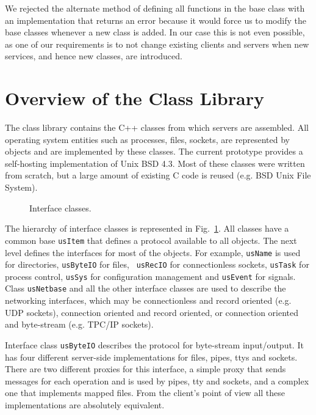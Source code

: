 We rejected the alternate method of defining all functions in the base
class with an implementation that returns an error because it would
force us to modify the base classes whenever a new class is added. In
our case this is not even possible, as one of our requirements is to
not change existing clients and servers when new services, and hence
new classes, are introduced.

\section{Overview of the Class Library}

The class library contains the C++ classes from which servers
are assembled. All operating system entities such as processes, files,
sockets, are represented by objects and are implemented by these
classes. The current prototype provides a self-hosting implementation
of Unix BSD 4.3.  Most of these classes were written from scratch,
but a large amount of existing C code is reused (e.g. BSD Unix File
System). 

\begin{figure}[htbp]
\vspace{7cm}
{}
\caption{Interface classes.}
\label{fig_intclasses}
\end{figure}

The hierarchy of interface classes is represented in
Fig.~\ref{fig_intclasses}. All classes have a common base {\tt usItem}
that defines a protocol available to all objects. The next
level defines the interfaces for most of the objects. For example,
{\tt usName} is used for directories, {\tt usByteIO} for files, {\tt
usRecIO} for connectionless sockets, {\tt usTask} for process control,
{\tt usSys} for configuration management and {\tt usEvent} for signals.
Class {\tt usNetbase} and all the other interface classes are used to
describe the networking interfaces, which may be connectionless and
record oriented (e.g. UDP sockets), connection oriented and record
oriented, or connection oriented and byte-stream (e.g. TPC/IP
sockets).

Interface class {\tt usByteIO} describes the protocol for
byte-stream input/output. It has four different server-side
implementations for files, pipes, ttys and sockets. There are two
different proxies for this interface, a simple proxy that sends
messages for each operation and is used by pipes, tty and sockets, and
a complex one that implements mapped files. From the client's point of
view all these implementations are absolutely equivalent.

